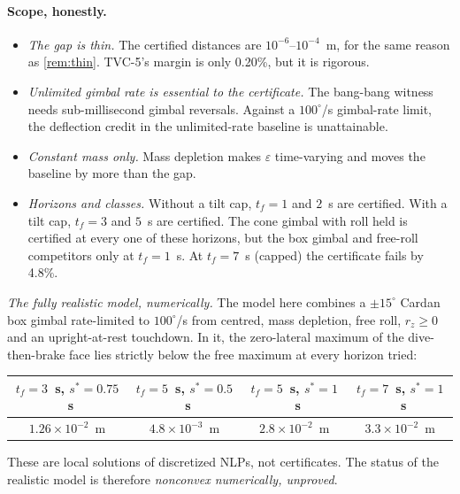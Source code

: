 \paragraph{Scope, honestly.}
\begin{itemize}[leftmargin=*,itemsep=1pt]
\item \emph{The gap is thin.} The certified distances are $10^{-6}$--$10^{-4}$~m, for the same reason as \cref{rem:thin}. TVC-5's margin
is only 0.20\%, but it is rigorous.
\item \emph{Unlimited gimbal rate is essential to the certificate.} The bang-bang witness needs sub-millisecond gimbal reversals.
Against a $100^\circ$/s gimbal-rate limit, the deflection credit in the unlimited-rate baseline is unattainable.
\item \emph{Constant mass only.} Mass depletion makes $\varepsilon$ time-varying and moves the baseline by more than the gap.
\item \emph{Horizons and classes.} Without a tilt cap, $t_f=1$ and $2$~s are certified. With a tilt cap, $t_f=3$ and $5$~s are certified.
The cone gimbal with roll held is certified at every one of these horizons, but the box gimbal and free-roll competitors only at
$t_f=1$~s. At $t_f=7$~s (capped) the certificate fails by 4.8\%.
\end{itemize}
\emph{The fully realistic model, numerically.} The model here combines a $\pm15^\circ$ Cardan box gimbal rate-limited to $100^\circ$/s
from centred, mass depletion, free roll, $r_z\ge0$ and an upright-at-rest touchdown. In it, the zero-lateral maximum of the
dive-then-brake face lies strictly below the free maximum at every horizon tried:
\begin{center}\small
\begin{tabular}{@{}cccc@{}}\toprule
$t_f=3$~s, $s^*=0.75$~s & $t_f=5$~s, $s^*=0.5$~s & $t_f=5$~s, $s^*=1$~s & $t_f=7$~s, $s^*=1$~s\\\midrule
$1.26\times10^{-2}$~m & $4.8\times10^{-3}$~m & $2.8\times10^{-2}$~m & $3.3\times10^{-2}$~m\\\bottomrule
\end{tabular}
\end{center}
These are local solutions of discretized NLPs, not certificates. The status of the realistic model is therefore
\emph{nonconvex numerically, unproved}.\Snum

